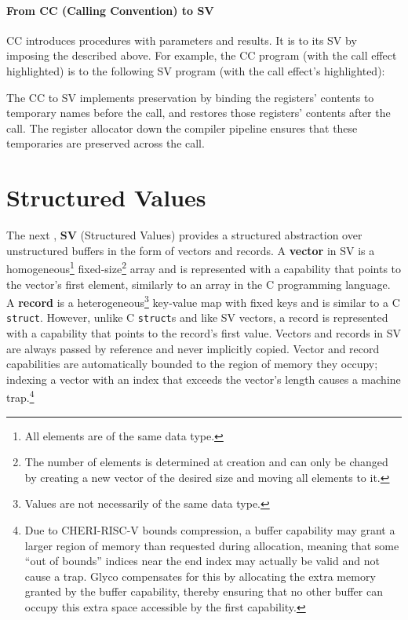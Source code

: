 \documentclass[main.tex]{subfiles}
\begin{document}
\paragraph{From CC (Calling Convention) to SV} CC introduces procedures with parameters and results. It is \lowered{} to its  SV by imposing the  described above. For example, the CC program (with the call effect highlighted)
is \lowered{} to the following SV program (with the call effect's  highlighted):

The CC to SV  implements  preservation by binding the registers' contents to temporary names before the call, and restores those registers' contents after the call. The register allocator down the compiler pipeline ensures that these temporaries are preserved across the call.

\section{Structured Values} \label{sct:sv}
The next , \textbf{SV} (Structured Values) provides a structured abstraction over unstructured buffers in the form of vectors and records. A \textbf{vector} in SV is a homogeneous\footnote{All elements are of the same data type.} fixed-size\footnote{The number of elements is determined at creation and can only be changed by creating a new vector of the desired size and moving all elements to it.} array and is represented with a capability that points to the vector's first element, similarly to an array in the C programming language. A \textbf{record} is a heterogeneous\footnote{Values are not necessarily of the same data type.} key-value map with fixed keys and is similar to a C \texttt{struct}. However, unlike C \texttt{struct}s and like SV vectors, a record is represented with a capability that points to the record's first value. Vectors and records in SV are always passed by reference and never implicitly copied. Vector and record capabilities are automatically bounded to the region of memory they occupy; indexing a vector with an index that exceeds the vector's length causes a machine trap.\footnote{Due to CHERI-RISC-V bounds compression, a buffer capability may grant a larger region of memory than requested during allocation, meaning that some \enquote{out of bounds} indices near the end index may actually be valid and not cause a trap. Glyco compensates for this by allocating the extra memory granted by the buffer capability, thereby ensuring that no other buffer can occupy this extra space accessible by the first capability.}
\end{document}
